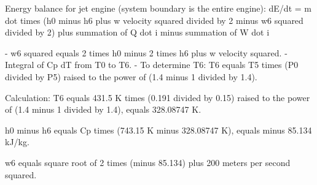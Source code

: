 Energy balance for jet engine (system boundary is the entire engine):  
dE/dt = m dot times (h0 minus h6 plus w velocity squared divided by 2 minus w6 squared divided by 2) plus summation of Q dot i minus summation of W dot i  

- w6 squared equals 2 times h0 minus 2 times h6 plus w velocity squared.  
- Integral of Cp dT from T0 to T6.  
- To determine T6:  
  T6 equals T5 times (P0 divided by P5) raised to the power of (1.4 minus 1 divided by 1.4).  

Calculation:  
T6 equals 431.5 K times (0.191 divided by 0.15) raised to the power of (1.4 minus 1 divided by 1.4), equals 328.08747 K.  

h0 minus h6 equals Cp times (743.15 K minus 328.08747 K), equals minus 85.134 kJ/kg.  

w6 equals square root of 2 times (minus 85.134) plus 200 meters per second squared.